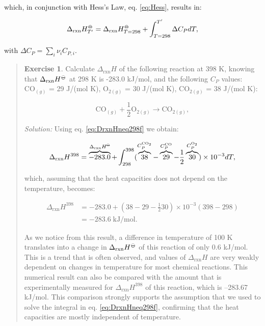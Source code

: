 \documentclass[
  9pt,
]{extbook}
\theoremstyle{definition}
\theoremstyle{definition}
\theoremstyle{definition}
\newtheorem{exercise}{Exercise}[chapter]
\theoremstyle{remark}
\begin{document}
which, in conjunction with Hess's Law, eq. \eqref{eq:Hess}, results in:

\begin{equation}
 \Delta_{\text{rxn}} H_{T'}^{-\kern-6pt{\ominus}\kern-6pt-}= \Delta_{\text{rxn}} H_{T=298}^{-\kern-6pt{\ominus}\kern-6pt-}+ \int_{T=298}^{T'} \Delta C_P dT,
  \label{eq:DrxnHneq298f}
\end{equation}

with \(\Delta C_P = \sum_i \nu_i C_{P,i}\).

\begin{quote}
\begin{exercise}
\protect\hypertarget{exr:DHtdiff298}{}{\label{exr:DHtdiff298} }Calculate \(\Delta_{\text{rxn}}H\) of the following reaction at 398 K, knowing that \(\Delta_{\text{rxn}}H^{-\kern-6pt{\ominus}\kern-6pt-}\) at 298 K is -283.0 kJ/mol, and the following \(C_P\) values: \(\mathrm{CO}_{(g)}\) = 29 J/(mol K), \(\mathrm{O}_{2(g)}\) = 30 J/(mol K), \(\mathrm{CO}_{2(g)}\) = 38 J/(mol K):

\[
\mathrm{CO}_{(g)}+\frac{1}{2}\mathrm{O}_{2(g)} \rightarrow \mathrm{CO}_{2(g)},
\]

\emph{Solution:} Using eq. \eqref{eq:DrxnHneq298f} we obtain:

\[
 \Delta_{\text{rxn}} H^{398} = \overbrace{-283.0}^{\Delta_{\text{rxn}}H^{-\kern-6pt{\ominus}\kern-6pt-}} + \int_{298}^{398} ( \overbrace{38}^{C_P^{\mathrm{CO}_2}} -\overbrace{29}^{C_P^{\mathrm{CO}}} -\frac{1}{2}\overbrace{30}^{C_P^{\mathrm{O}_2}} ) \times 10^{-3} dT,
\]

which, assuming that the heat capacities does not depend on the temperature, becomes:

\begin{equation}
\begin{aligned}
 \Delta_{\text{rxn}} H^{398} &= -283.0 + \left(38-29-\frac{1}{2}30 \right) \times 10^{-3} (398-298) \\ &= -283.6 \; \text{kJ/mol}.
\end{aligned}
\end{equation}

As we notice from this result, a difference in temperature of 100 K translates into a change in \(\Delta_{\text{rxn}}H^{-\kern-6pt{\ominus}\kern-6pt-}\) of this reaction of only 0.6 kJ/mol. This is a trend that is often observed, and values of \(\Delta_{\text{rxn}}H\) are very weakly dependent on changes in temperature for most chemical reactions. This numerical result can also be compared with the amount that is experimentally measured for \(\Delta_{\text{rxn}}H^{398}\) of this reaction, which is --283.67 kJ/mol. This comparison strongly supports the assumption that we used to solve the integral in eq. \eqref{eq:DrxnHneq298f}, confirming that the heat capacities are mostly independent of temperature.
\end{exercise}
\end{quote}
\end{document}
